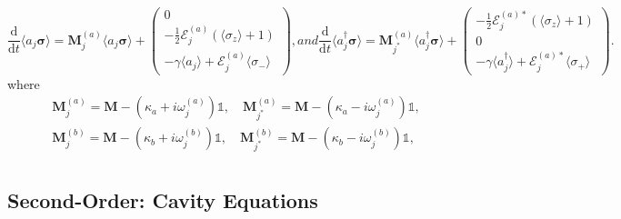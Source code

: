 \documentclass{article}
\newcommand{\ddt}[1][]{\frac{\mathrm{d} #1}{\mathrm{d}t}}
\begin{document}
\begin{subequations}
	\begin{equation}
		\ddt \langle a_{j} \bm{\sigma} \rangle = \bm{M}_{j}^{(a)} \langle a_{j} \bm{\sigma} \rangle + 
		\begin{pmatrix}
			0 \\
			-\frac{1}{2} \mathcal{E}_{j}^{(a)} \left( \langle \sigma_{z} \rangle + 1 \right) \\
			-\gamma \langle a_{j} \rangle + \mathcal{E}_{j}^{(a)} \langle \sigma_{-} \rangle
		\end{pmatrix},
	\end{equation}
	and
	\begin{equation}
		\ddt \langle a^{\dagger}_{j} \bm{\sigma} \rangle = \bm{M}_{j^{*}}^{(a)} \langle a^{\dagger}_{j} \bm{\sigma} \rangle + 
		\begin{pmatrix}
			-\frac{1}{2} \mathcal{E}_{j}^{(a) *} \left( \langle \sigma_{z} \rangle + 1 \right) \\
			0 \\
			-\gamma \langle a^{\dagger}_{j} \rangle + \mathcal{E}_{j}^{(a) *} \langle \sigma_{+} \rangle
		\end{pmatrix}.
	\end{equation}
\end{subequations}
where
\begin{subequations}
	\begin{gather}
		\bm{M}^{(a)}_{j} = \bm{M} - \left( \kappa_{a} + i \omega_{j}^{(a)} \right) \mathbb{1}, \quad \bm{M}^{(a)}_{j^{*}} = \bm{M} - \left( \kappa_{a} - i \omega_{j}^{(a)} \right) \mathbb{1}, \\
		\bm{M}^{(b)}_{j} = \bm{M} - \left( \kappa_{b} + i \omega_{j}^{(b)} \right) \mathbb{1}, \quad \bm{M}^{(b)}_{j^{*}} = \bm{M} - \left( \kappa_{b} - i \omega_{j}^{(b)} \right) \mathbb{1}, \\
	\end{gather}
\end{subequations}

\subsection{Second-Order: Cavity Equations}
\end{document}
